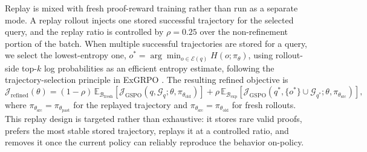 Replay is mixed with fresh proof-reward training rather than run as a separate
mode. A replay rollout injects one stored successful trajectory for the selected
query, and the replay ratio is controlled by $\rho=0.25$ over the non-refinement
portion of the batch. When multiple successful trajectories are stored for a
query, we select the lowest-entropy one, $o^*=\arg\min_{o\in\mathcal{E}(q)}
H(o;\pi_\theta)$, using rollout-side top-$k$ log probabilities as an efficient
entropy estimate, following the trajectory-selection principle in ExGRPO
\citep{exgrpo}. The resulting refined objective is
\begin{equation}
\mathcal{J}_{\mathrm{refined}}(\theta)=
(1-\rho)\,\mathbb{E}_{\mathcal{B}_{\mathrm{fresh}}}
\left[\mathcal{J}_{\mathrm{GSPO}}(q,\mathcal{G}_q;\theta,\pi_{\theta_{\mathrm{old}}})\right]
+\rho\,\mathbb{E}_{\mathcal{B}_{\mathrm{exp}}}
\left[\mathcal{J}_{\mathrm{GSPO}}(q^*,\{o^*\}\cup\mathcal{G}_{q^*};\theta,\pi_{\theta_{\mathrm{src}}})\right],
\label{eq:refined-replay-objective}
\end{equation}
where $\pi_{\theta_{\mathrm{src}}}=\pi_{\theta_{\mathrm{past}}}$ for the replayed
trajectory and $\pi_{\theta_{\mathrm{src}}}=\pi_{\theta_{\mathrm{old}}}$ for fresh
rollouts. This replay design is targeted rather than exhaustive: it stores rare
valid proofs, prefers the most stable stored trajectory, replays it at a
controlled ratio, and removes it once the current policy can reliably reproduce
the behavior on-policy.
